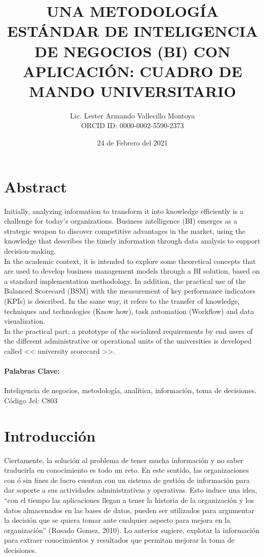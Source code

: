 \documentclass[12pt,jou]{apa7}
\title{UNA METODOLOGÍA ESTÁNDAR DE INTELIGENCIA DE NEGOCIOS (BI) CON APLICACIÓN: CUADRO DE MANDO UNIVERSITARIO}
\author{Lic. Lester Armando Vallecillo Montoya \\ ORCID ID: 0000-0002-5590-2373}
\date{24 de Febrero del 2021}
\affiliation{UNIVERSIDAD NACIONAL AUTÓNOMA DE HONDURAS, \textbf{Carrera de Matemáticas}, Honduras C.A., e-mail: lester.vallecillo@unah.hn}
\begin{document}
\maketitle   

\section{Abstract}
Initially, analyzing information to transform it into knowledge efficiently is a challenge for today's organizations. Business intelligence (BI) emerges as a strategic weapon to discover competitive advantages in the market, using the knowledge that describes the timely information through data analysis to support decision-making.\\

In the academic context, it is intended to explore some theoretical concepts that are used to develop business management models through a BI solution, based on a standard implementation methodology. In addition, the practical use of the Balanced Scorecard (BSM) with the measurement of key performance indicators (KPIs) is described. In the same way, it refers to the transfer of knowledge, techniques and technologies (Know how), task automation (Workflow) and data visualization.\\

In the practical part, a prototype of the socialized requirements by end users of the different administrative or operational units of the universities is developed called << university scorecard >>.\\
 
\paragraph{Palabras Clave:}	
Inteligencia de negocios, metodología, analítica, información, toma de decisiones.\\

Código Jel: C803

\section{Introducción}
Ciertamente, la solución al problema de tener mucha información y no saber traducirla en conocimiento es todo un reto. En este sentido, las organizaciones con ó sin fines de lucro cuentan con un sistema de gestión de información para dar soporte a sus actividades administrativas y operativas. Esto induce una idea,  “con el tiempo las aplicaciones llegan a tener la historia de la organización y los datos almacenados en las bases de datos, pueden ser utilizados para argumentar la decisión que se quiera tomar ante cualquier aspecto para mejora en la organización” (Rosado Gomez, 2010). Lo anterior sugiere, explotar la información para extraer conocimientos y resultados que permitan mejorar la toma de decisiones.\\
\end{document}

